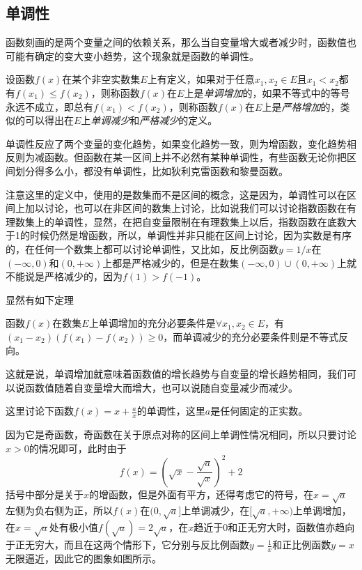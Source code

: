 \subsection{单调性}
\label{sec:monotonicity-of-function}

函数刻画的是两个变量之间的依赖关系，那么当自变量增大或者减少时，函数值也可能有确定的变大变小趋势，这个现象就是函数的单调性。

\begin{definition}
  设函数$f(x)$在某个非空实数集$E$上有定义，如果对于任意$x_1,x_2 \in E$且$x_1<x_2$都有$f(x_1) \leqslant f(x_2)$，则称函数$f(x)$在$E$上是\emph{单调增加}的，如果不等式中的等号永远不成立，即总有$f(x_1)<f(x_2)$，则称函数$f(x)$在$E$上是\emph{严格增加}的，类似的可以得出在$E$上\emph{单调减少}和\emph{严格减少}的定义。
\end{definition}

单调性反应了两个变量的变化趋势，如果变化趋势一致，则为增函数，变化趋势相反则为减函数。但函数在某一区间上并不必然有某种单调性，有些函数无论你把区间划分得多么小，都没有单调性，比如狄利克雷函数和黎曼函数。

注意这里的定义中，使用的是数集而不是区间的概念，这是因为，单调性可以在区间上加以讨论，也可以在非区间的数集上讨论，比如说我们可以讨论指数函数在有理数集上的单调性，显然，在把自变量限制在有理数集上以后，指数函数在底数大于1的时候仍然是增函数，所以，单调性并非只能在区间上讨论，因为实数是有序的，在任何一个数集上都可以讨论单调性，又比如，反比例函数$y=1/x$在$(-\infty,0)$和$(0,+\infty)$上都是严格减少的，但是在数集$(-\infty,0)\cup(0,+\infty)$上就不能说是严格减少的，因为$f(1)>f(-1)$。

显然有如下定理
\begin{theorem}
  函数$f(x)$在数集$E$上单调增加的充分必要条件是$\forall x_1,x_2 \in E$，有$(x_1-x_2)(f(x_1)-f(x_2)) \geqslant 0$，而单调减少的充分必要条件则是不等式反向。
\end{theorem}

这就是说，单调增加就意味着函数值的增长趋势与自变量的增长趋势相同，我们可以说函数值随着自变量增大而增大，也可以说随自变量减少而减少。

\begin{example}
这里讨论下函数$f(x)=x+\frac{a}{x}$的单调性，这里$a$是任何固定的正实数。

因为它是奇函数，奇函数在关于原点对称的区间上单调性情况相同，所以只要讨论$x>0$的情况即可，此时由于
$$
f(x)=\left( \sqrt{x}-\frac{\sqrt{a}}{\sqrt{x}} \right)^2+2
$$
括号中部分是关于$x$的增函数，但是外面有平方，还得考虑它的符号，在$x=\sqrt{a}$左侧为负右侧为正，所以$f(x)$在$(0,\sqrt{a}]$上单调减少，在$[\sqrt{a},+\infty)$上单调增加，在$x=\sqrt{a}$处有极小值$f(\sqrt{a})=2\sqrt{a}$，在$x$趋近于0和正无穷大时，函数值亦趋向于正无穷大，而且在这两个情形下，它分别与反比例函数$y=\frac{1}{x}$和正比例函数$y=x$无限逼近，因此它的图象如图所示。
\end{example}

